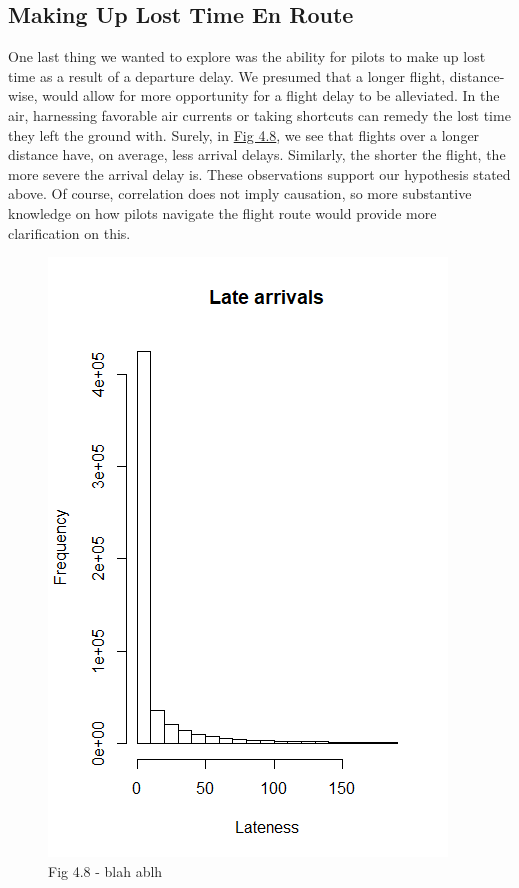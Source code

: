 \documentclass[12pt, a4paper]{book}
\newcommand\tab[1][1cm]{\hspace*{#1}}
\begin{document}
		\subsection{Making Up Lost Time En Route}
			\tab One last thing we wanted to explore was the ability for pilots to make up lost time as a result of a departure delay. We presumed that a longer flight, distance-wise, would allow for more opportunity for a flight delay to be alleviated. In the air, harnessing favorable air currents or taking shortcuts can remedy the lost time they left the ground with. Surely, in \underline{Fig 4.8}, we see that flights over a longer distance have, on average, less arrival delays. Similarly, the shorter the flight, the more severe the arrival delay is. These observations support our hypothesis stated above. Of course, correlation does not imply causation, so more substantive knowledge on how pilots navigate the flight route would provide more clarification on this. \\
			\begin{figure}[h]
	 		\includegraphics[width = 1 \textwidth]{../figures/LateArrivalsHistogram}
	 		\caption{Fig 4.8 - blah ablh}
	 		\end{figure}
	 		
\end{document}
